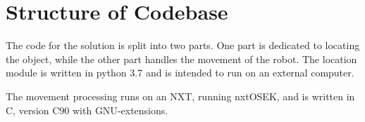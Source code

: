 \section{Structure of Codebase}
The code for the solution is split into two parts.
One part is dedicated to locating the object, while the other part handles the movement of the robot.
The location module is written in python 3{.}7 and is intended to run on an external computer.

The movement processing runs on an NXT, running nxtOSEK, and is written in C, version C90 with GNU-extensions.



